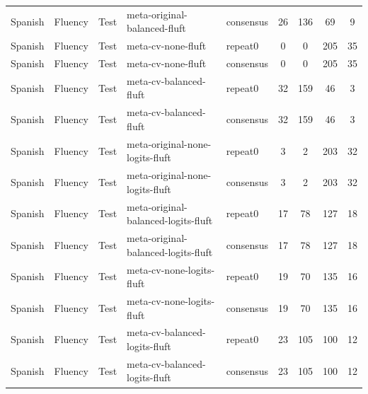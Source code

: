 \begin{tabular}{lllllcccc}
Spanish & Fluency & Test & meta-original-balanced-fluft & consensus & 26 & 136 & 69 & 9 \\
Spanish & Fluency & Test & meta-cv-none-fluft & repeat0 & 0 & 0 & 205 & 35 \\
Spanish & Fluency & Test & meta-cv-none-fluft & consensus & 0 & 0 & 205 & 35 \\
Spanish & Fluency & Test & meta-cv-balanced-fluft & repeat0 & 32 & 159 & 46 & 3 \\
Spanish & Fluency & Test & meta-cv-balanced-fluft & consensus & 32 & 159 & 46 & 3 \\
Spanish & Fluency & Test & meta-original-none-logits-fluft & repeat0 & 3 & 2 & 203 & 32 \\
Spanish & Fluency & Test & meta-original-none-logits-fluft & consensus & 3 & 2 & 203 & 32 \\
Spanish & Fluency & Test & meta-original-balanced-logits-fluft & repeat0 & 17 & 78 & 127 & 18 \\
Spanish & Fluency & Test & meta-original-balanced-logits-fluft & consensus & 17 & 78 & 127 & 18 \\
Spanish & Fluency & Test & meta-cv-none-logits-fluft & repeat0 & 19 & 70 & 135 & 16 \\
Spanish & Fluency & Test & meta-cv-none-logits-fluft & consensus & 19 & 70 & 135 & 16 \\
Spanish & Fluency & Test & meta-cv-balanced-logits-fluft & repeat0 & 23 & 105 & 100 & 12 \\
Spanish & Fluency & Test & meta-cv-balanced-logits-fluft & consensus & 23 & 105 & 100 & 12 \\
\hline
\end{tabular}

